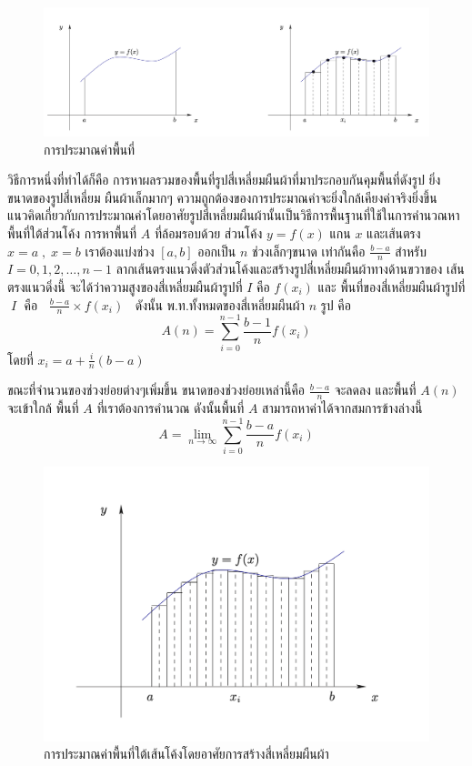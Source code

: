 \documentclass[
]{book}
\begin{document}
\begin{figure}
\includegraphics[width=1\linewidth]{images/fig-area-1} \caption{การประมาณค่าพื้นที่}\label{fig:fig-area-1}
\end{figure}

วิธีการหนึ่งที่ทำได้ก็คือ การหาผลรวมของพื้นที่รูปสี่เหลี่ยมผืนผ้าที่มาประกอบกันคุมพื้นที่ดังรูป
ยิ่งขนาดของรูปสี่เหลี่ยม ผืนผ้าเล็กมากๆ
ความถูกต้องของการประมาณค่าจะยิ่งใกล้เคียงค่าจริงยิ่งขึ้น
แนวคิดเกี่ยวกับการประมาณค่าโดยอาศัยรูปสี่เหลี่ยมผืนผ้านั้นเป็นวิธีการพื้นฐานที่ใช้ในการคำนวณหาพื้นที่ใต้ส่วนโค้ง
การหาพื้นที่ \(A\) ที่ล้อมรอบด้วย ส่วนโค้ง \(y=f(x)\) แกน \(x\) และเส้นตรง
\(x=a\;,\;x=b\) เราต้องแบ่งช่วง \([a,b]\) ออกเป็น \(n\) ช่วงเล็กๆขนาด เท่ากันคือ
\(\frac{b-a}{n}\) สำหรับ \(I=0,1,2,…,n-1\)
ลากเส้นตรงแนวดิ่งตัวส่วนโค้งและสร้างรูปสี่เหลี่ยมผืนผ้าทางด้านขวาของ เส้นตรงแนวดิ่งนี้
จะได้ว่าความสูงของสี่เหลี่ยมผืนผ้ารูปที่ \(I\) คือ \(f(x_i)\) และ พื้นที่ของสี่เหลี่ยมผืนผ้ารูปที่
\(\;I\;\) คือ \(\;\;\frac{b-a}{n}\times f(x_i)\;\;\) ดังนั้น
พ.ท.ทั้งหมดของสี่เหลี่ยมผืนผ้า \(n\) รูป คือ
\[A(n)= \sum_{i=0}^{n-1}\frac{b-1}{n}f(x_i)\] โดยที่
\(x_i = a + \frac{i}{n}(b-a)\)

ขณะที่จำนวนของช่วงย่อยต่างๆเพิ่มขึ้น ขนาดของช่วงย่อยเหล่านี้คือ \(\frac{b-a}{n}\)
จะลดลง และพื้นที่ \(A(n)\) จะเข้าใกล้ พื้นที่ \(A\) ที่เราต้องการคำนวณ ดังนั้นพื้นที่ \(A\)
สามารถหาค่าได้จากสมการข้างล่างนี้
\[A= \lim\limits_{n\rightarrow\infty}\sum_{i=0}^{n-1}\frac{b-a}{n}f(x_i)\]

\begin{figure}
\includegraphics[width=1\linewidth]{images/fig-area-2} \caption{การประมาณค่าพื้นที่ใต้เส้นโค้งโดยอาศัยการสร้างสี่เหลี่ยมผืนผ้า}\label{fig:fig-area-2}
\end{figure}
\end{document}
